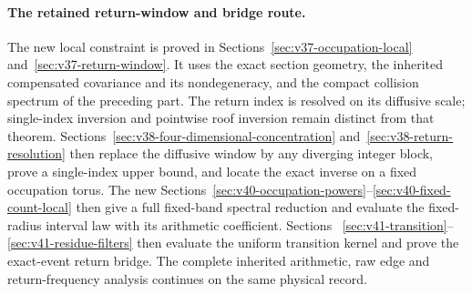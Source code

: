 \documentclass[11pt,reqno]{amsart}
\numberwithin{equation}{section}
\theoremstyle{definition}\newtheorem{definition}[theorem]{Definition}
\theoremstyle{remark}\newtheorem{remark}[theorem]{Remark}
\begin{document}
\paragraph{The retained return-window and bridge route.}
The new local constraint is proved in
Sections~\ref{sec:v37-occupation-local} and~\ref{sec:v37-return-window}.
It uses the exact section geometry, the inherited compensated
covariance and its nondegeneracy, and the compact collision spectrum
of the preceding part. The return index is resolved on its diffusive scale;
single-index inversion and pointwise roof inversion remain distinct
from that theorem. Sections~\ref{sec:v38-four-dimensional-concentration}
and~\ref{sec:v38-return-resolution} then replace the diffusive window
by any diverging integer block, prove a single-index upper bound, and
locate the exact inverse on a fixed occupation torus. The new
Sections~\ref{sec:v40-occupation-powers}--\ref{sec:v40-fixed-count-local}
then give a full fixed-band spectral reduction and evaluate the
fixed-radius interval law with its arithmetic coefficient. Sections~
\ref{sec:v41-transition}--\ref{sec:v41-residue-filters} then evaluate
the uniform transition kernel and prove the exact-event return bridge. The
complete inherited arithmetic, raw edge and return-frequency analysis
continues on the same physical record.

















\end{document}
